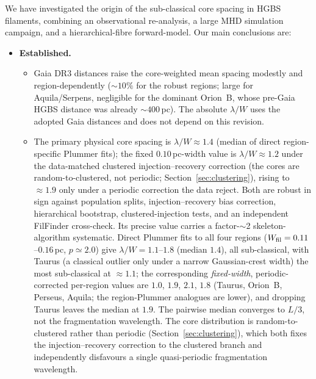 \documentclass[usenatbib,twoside,twocolumn]{mnras}
\begin{document}
We have investigated the origin of the sub-classical core spacing in HGBS filaments, combining an observational re-analysis, a large MHD simulation campaign, and a hierarchical-fibre forward-model. Our main conclusions are:

\begin{itemize}
    \item \textbf{Established.}
    \begin{itemize}
        \item Gaia DR3 distances raise the core-weighted mean spacing modestly and region-dependently ($\sim10\%$ for the robust regions; large for Aquila/Serpens, negligible for the dominant Orion~B, whose pre-Gaia HGBS distance was already $\sim400$\,pc). The absolute $\lambda/W$ uses the adopted Gaia distances and does not depend on this revision.
        \item The primary physical core spacing is $\lambda/W\approx1.4$ (median of direct region-specific Plummer fits); the fixed $0.10$\,pc-width value is $\lambda/W\approx1.2$ under the data-matched clustered injection--recovery correction (the cores are random-to-clustered, not periodic; Section~\ref{sec:clustering}), rising to $\approx1.9$ only under a periodic correction the data reject. Both are robust in sign against population splits, injection--recovery bias correction, hierarchical bootstrap, clustered-injection tests, and an independent FilFinder cross-check. Its precise value carries a factor-$\sim$2 skeleton-algorithm systematic. Direct Plummer fits to all four regions ($W_{\rm fil}=0.11$--$0.16$\,pc, $p\simeq2.0$) give $\lambda/W=1.1$--$1.8$ (median $1.4$), all sub-classical, with Taurus (a classical outlier only under a narrow Gaussian-crest width) the most sub-classical at $\approx1.1$; the corresponding \emph{fixed-width}, periodic-corrected per-region values are $1.0$, $1.9$, $2.1$, $1.8$ (Taurus, Orion~B, Perseus, Aquila; the region-Plummer analogues are lower), and dropping Taurus leaves the median at $1.9$. The pairwise median converges to $L/3$, not the fragmentation wavelength. The core distribution is random-to-clustered rather than periodic (Section~\ref{sec:clustering}), which both fixes the injection--recovery correction to the clustered branch and independently disfavours a single quasi-periodic fragmentation wavelength.

\end{itemize}
\end{itemize}
\end{document}
